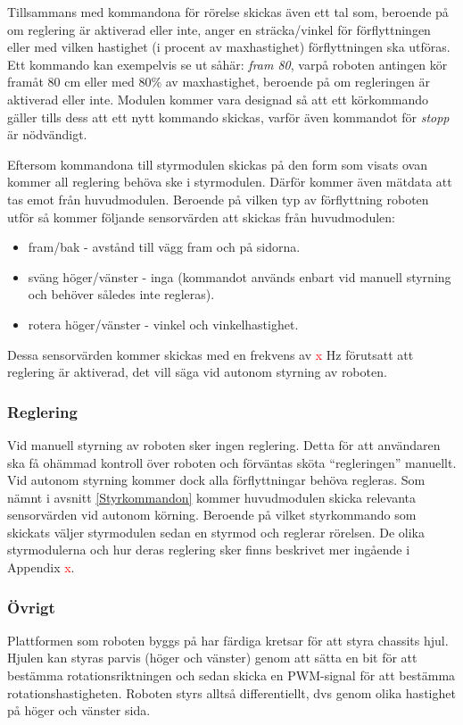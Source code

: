 \documentclass[11pt]{article}
\begin{document}
\begin{flushleft}
Tillsammans med kommandona för rörelse skickas även ett tal som, beroende på om reglering är aktiverad eller inte, anger en sträcka/vinkel för förflyttningen eller med vilken hastighet (i procent av maxhastighet) förflyttningen ska utföras. Ett kommando kan exempelvis se ut såhär: \textit{fram 80}, varpå roboten antingen kör framåt 80 cm eller med 80\% av maxhastighet, beroende på om regleringen är aktiverad eller inte. Modulen kommer vara designad så att ett körkommando gäller tills dess att ett nytt kommando skickas, varför även kommandot för \textit{stopp} är nödvändigt.

Eftersom kommandona till styrmodulen skickas på den form som visats ovan kommer all reglering behöva ske i styrmodulen. Därför kommer även mätdata att tas emot från huvudmodulen. Beroende på vilken typ av förflyttning roboten utför så kommer följande sensorvärden att skickas från huvudmodulen:
\begin{itemize}
	\item fram/bak - avstånd till vägg fram och på sidorna.
	\item sväng höger/vänster - inga (kommandot används enbart vid manuell styrning och behöver således inte regleras).
	\item rotera höger/vänster - vinkel och vinkelhastighet.
\end{itemize}
Dessa sensorvärden kommer skickas med en frekvens av \textcolor{red}{x} Hz förutsatt att reglering är aktiverad, det vill säga vid autonom styrning av roboten.

\subsubsection{Reglering}
Vid manuell styrning av roboten sker ingen reglering. Detta för att användaren ska få ohämmad kontroll över roboten och förväntas sköta ``regleringen'' manuellt. Vid autonom styrning kommer dock alla förflyttningar behöva regleras. Som nämnt i avsnitt \ref{Styrkommandon} kommer huvudmodulen skicka relevanta sensorvärden vid autonom körning. Beroende på vilket styrkommando som skickats väljer styrmodulen sedan en styrmod och reglerar rörelsen. De olika styrmodulerna och hur deras reglering sker finns beskrivet mer ingående i Appendix \textcolor{red}{x}.

\subsubsection{Övrigt}
Plattformen som roboten byggs på har färdiga kretsar för att styra chassits hjul. Hjulen kan styras parvis (höger och vänster) genom att sätta en bit för att bestämma rotationsriktningen och sedan skicka en PWM-signal för att bestämma rotationshastigheten. Roboten styrs alltså differentiellt, dvs genom olika hastighet på höger och vänster sida.


\end{flushleft}
\end{document}
